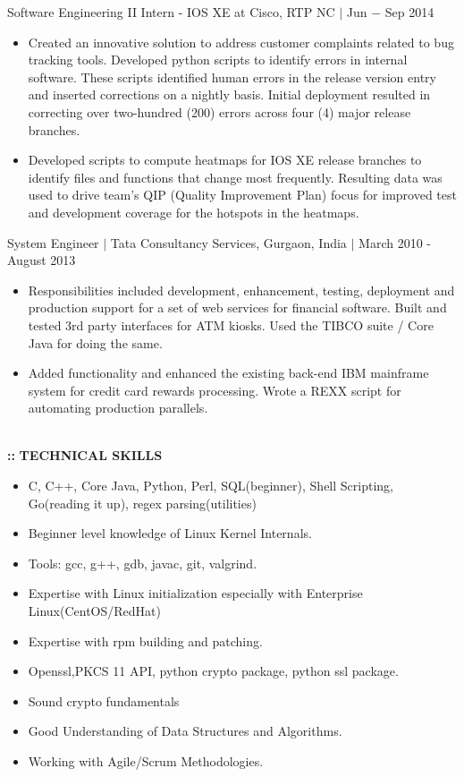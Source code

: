 \documentclass[9pt,twosided,a4paper]{scrreprt}
\begin{document}
\LARGE Software Engineering II Intern - IOS XE at Cisco, RTP NC $|$ Jun $-$ Sep 2014
\begin{itemize}\itemsep0.4pt \parskip0pt %
\Large\item Created an innovative solution to address customer complaints related to bug tracking tools. Developed python scripts to identify errors in internal software. These scripts identified human errors in the release version entry and inserted corrections on a nightly basis. Initial deployment resulted in correcting over two-hundred (200) errors across four (4) major release branches.
\Large\item Developed scripts to compute heatmaps for IOS XE release branches to identify files and functions that change most frequently.  Resulting data was used to drive team's QIP (Quality Improvement Plan) focus for improved test and development coverage for the hotspots in the heatmaps.\\%
\end{itemize}                                                                  
System Engineer $|$ Tata Consultancy Services, Gurgaon, India $|$ March 2010  - August 2013\vspace{-5pt}%
\begin{itemize}\itemsep0.4pt \parskip0pt %
\Large\item Responsibilities included development, enhancement, testing, deployment and production support for a set of web services for financial software. Built and tested 3rd party interfaces for ATM kiosks. Used the TIBCO suite / Core Java for doing the same.
\Large\item Added functionality and enhanced the existing back-end IBM mainframe system for credit card rewards processing. Wrote a REXX script for automating production parallels.\\\\%
\end{itemize}
\LARGE \textbf{\color{red}\Huge::}  \textbf{TECHNICAL SKILLS}\vspace{-5pt}%
\begin{itemize}\itemsep0.4pt \parskip0pt %
\Large\item C, C++, Core Java, Python, Perl, SQL(beginner), Shell Scripting,  Go(reading it up), regex parsing(utilities)
\Large\item Beginner level knowledge of Linux Kernel Internals.%
\Large\item Tools: gcc, g++, gdb, javac, git, valgrind.
\Large\item Expertise with Linux initialization especially with Enterprise Linux(CentOS/RedHat)
\Large\item Expertise with rpm building and patching.
\Large\item Openssl,PKCS 11 API, python crypto package, python ssl package.
\Large\item Sound crypto fundamentals
\Large\item Good Understanding of Data Structures and Algorithms.
\Large\item Working with Agile/Scrum Methodologies.\\%
\end{itemize}
\end{document}

